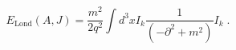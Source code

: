 \begin{equation}
E_{\mathrm{Lond}}(A,J)=\frac{m^{2}}{2q^{2}}\int d^{3}xI_{k}\frac{1}{\left(
-\partial ^{2}+m^{2}\right) }I_{k}\;.  \label{ldd}
\end{equation}

